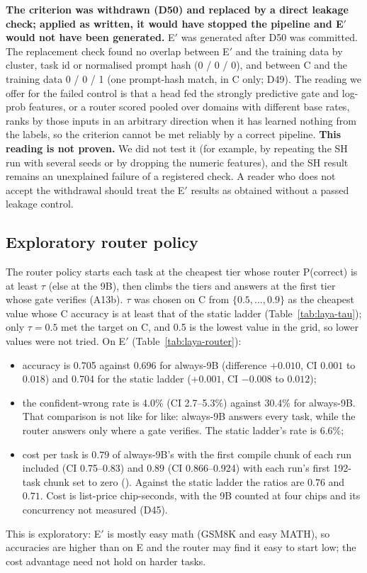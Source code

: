\documentclass[11pt,a4paper]{article}
\newcommand{\code}[1]{\texttt{\detokenize{#1}}}
\begin{document}
\textbf{The criterion was withdrawn (D50) and replaced by a direct leakage check; applied as written, it would have stopped the pipeline and E$'$ would not
have been generated.} E$'$ was generated after D50 was committed. The replacement check found no overlap between E$'$ and the training data by cluster, task id or normalised prompt hash
(0 / 0 / 0), and between C and the training data 0 / 0 / 1 (one prompt-hash match, in C only; D49). The reading we offer for the failed control is that a head fed
the strongly predictive gate and log-prob features, or a router scored pooled over domains with different base rates, ranks by those inputs in an arbitrary direction
when it has learned nothing from the labels, so the criterion cannot be met reliably by a correct pipeline. \textbf{This reading is not proven.} We did not test it
(for example, by repeating the SH run with several seeds or by dropping the numeric features), and the SH result remains an unexplained failure of a registered
check. A reader who does not accept the withdrawal should treat the E$'$ results as obtained without a passed leakage control.

\subsection{Exploratory router policy}\label{sec:laya-router}

The router policy starts each task at the cheapest tier whose router P(correct) is at least $\tau$ (else at the 9B), then climbs the tiers and answers at the first tier whose gate verifies
(A13b). $\tau$ was chosen on C from $\{0.5,\dots,0.9\}$ as the cheapest value whose C accuracy is at least that of the static ladder (Table~\ref{tab:laya-tau}); only $\tau=0.5$
met the target on C, and 0.5 is the lowest value in the grid, so lower values were not tried. On E$'$ (Table~\ref{tab:laya-router}):
\begin{itemize}
\item accuracy is 0.705 against 0.696 for always-9B (difference $+0.010$, CI $0.001$ to $0.018$) and 0.704 for the static ladder ($+0.001$, CI $-0.008$ to $0.012$);
\item the confident-wrong rate is 4.0\% (CI 2.7--5.3\%) against 30.4\% for always-9B. That comparison is not like for like: always-9B answers every task, while the router answers
  only where a gate verifies. The static ladder's rate is 6.6\%;
\item cost per task is $0.79$ of always-9B's with the first compile chunk of each run included (CI 0.75--0.83) and $0.89$ (CI 0.866--0.924) with each run's first 192-task chunk set to zero
  (\code{router_nowarm.json}). Against the static ladder the ratios are $0.76$ and $0.71$. Cost is list-price chip-seconds, with the 9B counted at four chips and its concurrency not measured (D45).
\end{itemize}
This is exploratory: E$'$ is mostly easy math (GSM8K and easy MATH), so accuracies are higher than on E and the router may find it easy to start low; the cost advantage need not hold on harder tasks.
\end{document}
